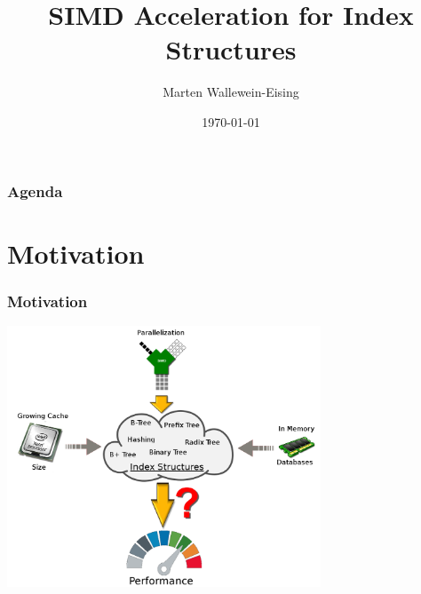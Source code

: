 \documentclass{beamer}
\title{SIMD Acceleration for Index Structures}
\author{Marten Wallewein-Eising}
\date{\today}
\institute{Otto von Guericke Univerity, Magdeburg}
\begin{document}
\begin{frame}[plain]
 \titlepage
\end{frame}



\section[Agenda]{}
\begin{frame}
\frametitle{Agenda}
\tableofcontents
\end{frame}

\section{Motivation}
\begin{frame}
\frametitle{Motivation}
	\begin{center}
		\includegraphics[width=0.7\textwidth]{img/big_picture.png}
	\end{center}
\end{frame}

\end{document}
